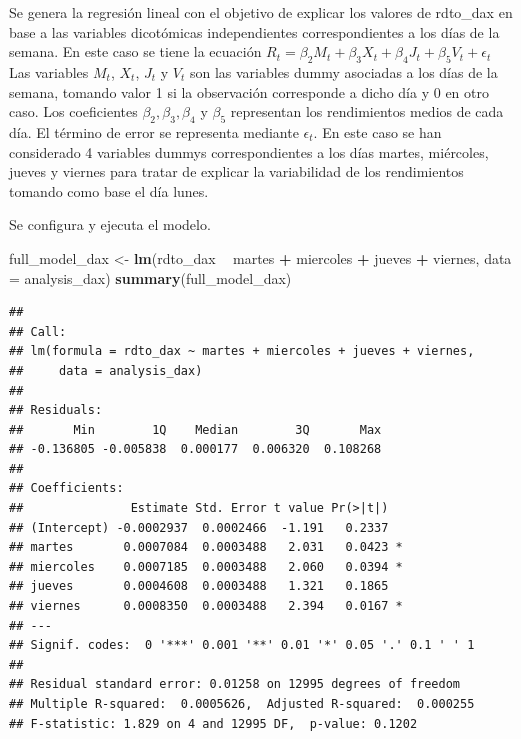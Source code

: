 \documentclass[
  11pt,
]{article}
\newenvironment{Shaded}{\begin{snugshade}}{\end{snugshade}}
\newcommand{\DataTypeTok}[1]{\textcolor[rgb]{0.13,0.29,0.53}{#1}}
\newcommand{\KeywordTok}[1]{\textcolor[rgb]{0.13,0.29,0.53}{\textbf{#1}}}
\newcommand{\NormalTok}[1]{#1}
\newcommand{\OperatorTok}[1]{\textcolor[rgb]{0.81,0.36,0.00}{\textbf{#1}}}
\newcommand{\StringTok}[1]{\textcolor[rgb]{0.31,0.60,0.02}{#1}}
\begin{document}
Se genera la regresión lineal con el objetivo de explicar los valores de
rdto\_dax en base a las variables dicotómicas independientes
correspondientes a los días de la semana. En este caso se tiene la
ecuación
\(R_t = \beta_2 M_t + \beta_3 X_t + \beta_4 J_t + \beta_5 V_t + \epsilon_t\)
Las variables \(M_t\), \(X_t\), \(J_t\) y \(V_t\) son las variables
dummy asociadas a los días de la semana, tomando valor 1 si la
observación corresponde a dicho día y 0 en otro caso. Los coeficientes
\(\beta_2, \beta_3, \beta_4\) y \(\beta_5\) representan los rendimientos
medios de cada día. El término de error se representa mediante
\(\epsilon_t\). En este caso se han considerado 4 variables dummys
correspondientes a los días martes, miércoles, jueves y viernes para
tratar de explicar la variabilidad de los rendimientos tomando como base
el día lunes.

Se configura y ejecuta el modelo.

\begin{Shaded}
\begin{Highlighting}[]
\NormalTok{full_model_dax <-}\StringTok{ }\KeywordTok{lm}\NormalTok{(rdto_dax }\OperatorTok{~}\StringTok{ }\NormalTok{martes }\OperatorTok{+}\StringTok{ }\NormalTok{miercoles }\OperatorTok{+}\StringTok{ }\NormalTok{jueves }\OperatorTok{+}\StringTok{ }\NormalTok{viernes, }\DataTypeTok{data =}\NormalTok{ analysis_dax)}
\KeywordTok{summary}\NormalTok{(full_model_dax)}
\end{Highlighting}
\end{Shaded}

\begin{verbatim}
## 
## Call:
## lm(formula = rdto_dax ~ martes + miercoles + jueves + viernes, 
##     data = analysis_dax)
## 
## Residuals:
##       Min        1Q    Median        3Q       Max 
## -0.136805 -0.005838  0.000177  0.006320  0.108268 
## 
## Coefficients:
##               Estimate Std. Error t value Pr(>|t|)  
## (Intercept) -0.0002937  0.0002466  -1.191   0.2337  
## martes       0.0007084  0.0003488   2.031   0.0423 *
## miercoles    0.0007185  0.0003488   2.060   0.0394 *
## jueves       0.0004608  0.0003488   1.321   0.1865  
## viernes      0.0008350  0.0003488   2.394   0.0167 *
## ---
## Signif. codes:  0 '***' 0.001 '**' 0.01 '*' 0.05 '.' 0.1 ' ' 1
## 
## Residual standard error: 0.01258 on 12995 degrees of freedom
## Multiple R-squared:  0.0005626,  Adjusted R-squared:  0.000255 
## F-statistic: 1.829 on 4 and 12995 DF,  p-value: 0.1202
\end{verbatim}
\end{document}
